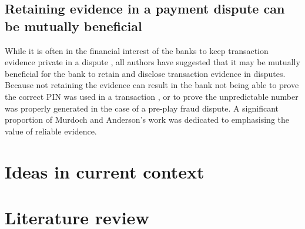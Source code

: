 \documentclass[11pt]{article}
\begin{document}
\subsection{Retaining evidence in a payment dispute can be mutually beneficial}

While it is often in the financial interest of the banks to keep transaction evidence private in a dispute \cite[Sec. VII]{murdoch2010chip} \cite[VIII. A.]{bond2014chip}, all authors have suggested that it may be mutually beneficial for the bank to retain and disclose transaction evidence in disputes. Because not retaining the evidence can result in the bank not being able to prove the correct PIN was used in a transaction \cite[p. 441]{murdoch2010chip}, or to prove the unpredictable number was properly generated in the case of a pre-play fraud dispute. A significant proportion of Murdoch and Anderson's work \cite[Sec. 3]{murdoch2014security} was dedicated to emphasising the value of reliable evidence.
 
\section{Ideas in current context}

\section{Literature review}



\footnotesize{}
\end{document}

